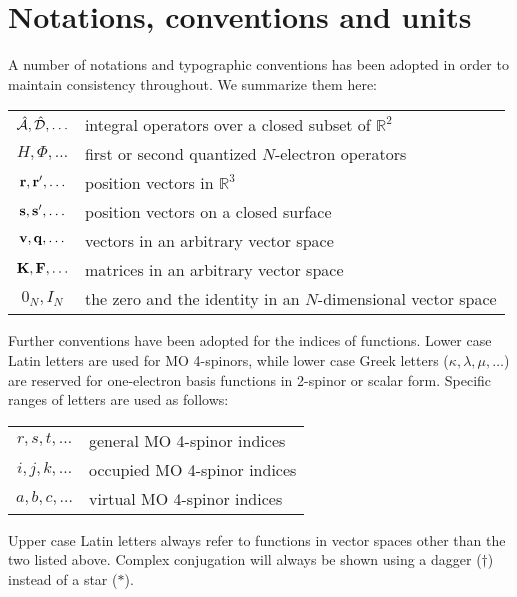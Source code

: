\chapter*{Notations, conventions and units}

A number of notations and typographic conventions has been adopted in
order to maintain consistency throughout. We summarize them here:
\begin{table*}[!h]
\begin{tabular}{c l}
 $\hat{\mathcal{A}}, \hat{\mathcal{D}}, \ldots$ & integral operators over a closed subset of $\mathbb{R}^2$ \\
 $H, \varPhi, \ldots$ & first or second quantized $N$-electron operators \\
 $\mathbf{r}, \mathbf{r}^\prime, \ldots$ & position vectors in $\mathbb{R}^3$ \\
 $\mathbf{s}, \mathbf{s}^\prime, \ldots$ & position vectors on a closed surface \\
 $\mathbf{v}, \mathbf{q}, \ldots$ & vectors in an arbitrary vector space \\
 $\mathbf{K}, \mathbf{F}, \ldots$ & matrices in an arbitrary vector space \\
 $0_N, I_N$ & the zero and the identity in an $N$-dimensional vector space
\end{tabular}
\end{table*}

Further conventions have been adopted for the indices of functions.
Lower case Latin letters are used for \ac{MO} 4-spinors, while lower case
Greek letters ($\kappa, \lambda, \mu, \ldots$) are reserved for
one-electron basis functions in 2-spinor or scalar form.
Specific ranges of letters are used as follows:
\begin{table*}[!h]
\begin{tabular}{c l}
 $r, s, t, \ldots$ & general MO 4-spinor indices \\
 $i, j, k, \ldots$ & occupied MO 4-spinor indices \\
 $a, b, c, \ldots$ & virtual MO 4-spinor indices
\end{tabular}
\end{table*}

Upper case Latin letters always refer to functions in vector spaces
other than the two listed above. Complex conjugation will always be
shown using a dagger ($\dagger$) instead of a star ($*$).

